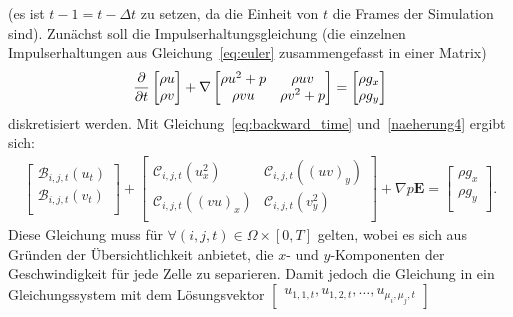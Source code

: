 (es ist $t-1=t-\Delta t$ zu setzen, da die Einheit von $t$ die Frames der Simulation sind). Zunächst soll die Impulserhaltungsgleichung (die einzelnen Impulserhaltungen aus Gleichung~\eqref{eq:euler} zusammengefasst in einer Matrix)
\begin{align*}
    \frac{\partial }{\partial t}\begin{bmatrix}
        \rho u \\
        \rho v \\
    \end{bmatrix}
    +
    \nabla \begin{bmatrix}
        \rho u^2 + p & \rho uv \\
        \rho vu & \rho v^2 + p \\
    \end{bmatrix}
    =
    \begin{bmatrix}
        \rho g_x \\
        \rho g_y
    \end{bmatrix}
\end{align*}
diskretisiert werden. Mit Gleichung~\eqref{eq:backward_time} und~\eqref{naeherung4} ergibt sich:
\begin{align}
\label{eq:diskret_system}
    \begin{bmatrix}
        \mathcal{B}_{i,j,t}(u_t) \\
        \mathcal{B}_{i,j,t}(v_t) \\
    \end{bmatrix}
    +
    \begin{bmatrix}
        \mathcal{C}_{i,j,t}(u^2_{x}) & \mathcal{C}_{i,j,t}((uv)_y) \\
        \mathcal{C}_{i,j,t}((vu)_x) & \mathcal{C}_{i,j,t}(v_{y}^2) \\
    \end{bmatrix}
    + \nabla p \boldsymbol{E} = \begin{bmatrix}
        \rho g_x \\
        \rho g_y \\
    \end{bmatrix}.
\end{align}
Diese Gleichung muss für $\forall(i,j,t)\in \Omega \times [0,T]$ gelten, wobei es sich aus Gründen der Übersichtlichkeit anbietet, die $x$- und $y$-Komponenten der Geschwindigkeit für jede Zelle zu separieren. Damit jedoch die Gleichung in ein Gleichungssystem mit dem Lösungsvektor $\begin{bmatrix}
    u_{1,1,t}, u_{1,2,t}, \ldots, u_{\mu_i, \mu_j , t}
\end{bmatrix}$
